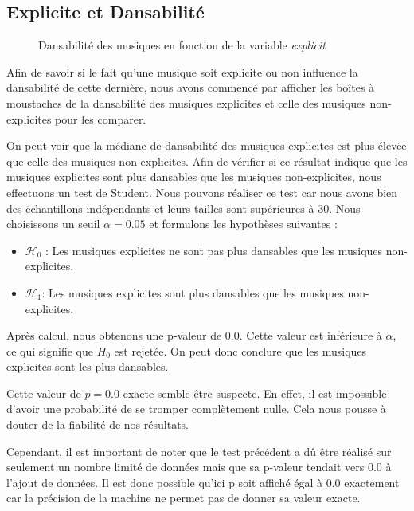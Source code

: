 \documentclass[a4paper, 12pt]{report}
\begin{document}
\subsection{Explicite et Dansabilité}

\begin{figure}[!h]
    \centering
    
    \caption{Dansabilité des musiques en fonction de la variable \textit{explicit}}
\end{figure}

Afin de savoir si le fait qu'une musique soit explicite ou non influence la dansabilité de cette dernière, nous avons commencé par afficher les boîtes à moustaches de la dansabilité des musiques explicites et celle des musiques non-explicites pour les comparer. 


On peut voir que la médiane de dansabilité des musiques explicites est plus élevée que celle des musiques non-explicites. Afin de vérifier si ce résultat indique que les musiques explicites sont plus dansables que les musiques non-explicites, nous effectuons un test de Student. Nous pouvons réaliser ce test car nous avons bien des échantillons indépendants et leurs tailles sont supérieures à 30. Nous choisissons un seuil $\alpha =0.05$ et formulons les hypothèses suivantes :

\begin{itemize}
    \item \(\mathcal{H_0}\) : Les musiques explicites ne sont pas plus dansables que les musiques non-explicites.
    \item \(\mathcal{H_1}\): Les musiques explicites sont plus dansables que les musiques non-explicites.
\end{itemize}

Après calcul, nous obtenons une p-valeur de 0.0. Cette valeur est inférieure à $\alpha$, ce qui signifie que $H_0$ est rejetée. On peut donc conclure que les musiques explicites sont les plus dansables. 

Cette valeur de $p = 0.0$ exacte semble être suspecte. En effet, il est impossible d'avoir une probabilité de se tromper complètement nulle. Cela nous pousse à douter de la fiabilité de nos résultats.

Cependant, il est important de noter que le test précédent a dû être réalisé sur seulement un nombre limité de données mais que sa p-valeur tendait vers 0.0 à l'ajout de données. Il est donc possible qu'ici p soit affiché égal à 0.0 exactement car la précision de la machine ne permet pas de donner sa valeur exacte. 
\end{document}
